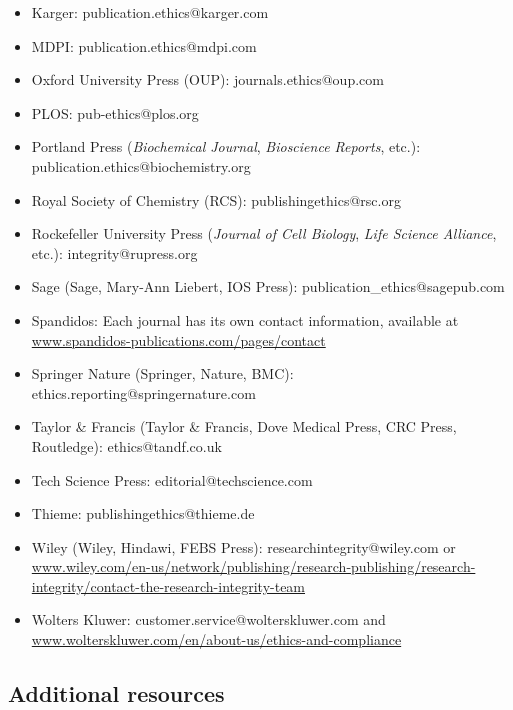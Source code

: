 \documentclass[letterpaper, 12pt]{article}
\begin{document}
\begin{itemize}
    \item Karger: publication.ethics@karger.com
    \item MDPI: publication.ethics@mdpi.com
    \item Oxford University Press (OUP): journals.ethics@oup.com
    \item PLOS: pub-ethics@plos.org
    \item Portland Press (\textit{Biochemical Journal}, \textit{Bioscience Reports}, etc.): publication.ethics@biochemistry.org
    \item Royal Society of Chemistry (RCS): publishingethics@rsc.org
    \item Rockefeller University Press (\textit{Journal of Cell Biology}, \textit{Life Science Alliance}, etc.): integrity@rupress.org
    \item Sage (Sage, Mary-Ann Liebert, IOS Press): publication\_ethics@sagepub.com
    \item Spandidos: Each journal has its own contact information, available at \href{https://www.spandidos-publications.com/pages/contact}{www.spandidos-publications.com/pages/contact}
    \item Springer Nature (Springer, Nature, BMC): ethics.reporting@springernature.com
    \item Taylor \& Francis (Taylor \& Francis, Dove Medical Press, CRC Press, Routledge): ethics@tandf.co.uk
    \item Tech Science Press: editorial@techscience.com
    \item Thieme: publishingethics@thieme.de
    \item Wiley (Wiley, Hindawi, FEBS Press): researchintegrity@wiley.com or \href{https://www.wiley.com/en-us/network/publishing/research-publishing/research-integrity/contact-the-research-integrity-team}{www.wiley.com/en-us/network/publishing/research-publishing/research-integrity/contact-the-research-integrity-team}
    \item Wolters Kluwer: customer.service@wolterskluwer.com and \href{https://www.wolterskluwer.com/en/about-us/ethics-and-compliance}{www.wolterskluwer.com/en/about-us/ethics-and-compliance}
\end{itemize}

\subsection*{Additional resources}
\end{document}
